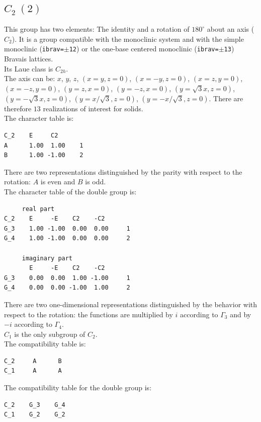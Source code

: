 \documentclass[12pt,a4paper]{article}
\begin{document}
\subsection{\color{web-blue}$C_2\ (2)$}
This group has two elements: The identity and a rotation of $180^\circ$ 
about an axis ($C_2$).
It is a group compatible with the monoclinic system and with the
simple monoclinic (\texttt{ibrav=$\pm$12}) or the one-base centered monoclinic 
(\texttt{ibrav=$\pm$13}) Bravais lattices. \\
Its Laue class is $C_{2h}$. \\
The axis can be:  
$x$, $y$, $z$, $(x=y, z=0)$, $(x=-y, z=0)$, $(x=z, y=0)$, $(x=-z, y=0)$,
$(y=z, x=0)$, $(y=-z, x=0)$, $(y=\sqrt{3}x, z=0)$, $(y=-\sqrt{3}x, z=0)$, 
$(y=x/\sqrt{3}, z=0)$, $(y=-x/\sqrt{3}, z=0)$. 
There are therefore $13$ realizations of interest for solids. \\
The character table is:
\begin{verbatim}
C_2    E     C2
A      1.00  1.00    1
B      1.00 -1.00    2
\end{verbatim}
There are two representations distinguished by the parity
with respect to the rotation: $A$ is even and $B$ is odd.\\
The character table of the double group is:
\begin{verbatim}
     real part
C_2    E     -E    C2    -C2
G_3    1.00 -1.00  0.00  0.00     1
G_4    1.00 -1.00  0.00  0.00     2

     imaginary part
       E     -E    C2    -C2
G_3    0.00  0.00  1.00 -1.00     1
G_4    0.00  0.00 -1.00  1.00     2
\end{verbatim}
There are two one-dimensional representations distinguished by the 
behavior with respect to the rotation: the functions
are multiplied by $i$ according to $\Gamma_3$ and by $-i$ according to 
$\Gamma_4$.\\
$C_1$ is the only subgroup of $C_2$. \\
The compatibility table is:
\begin{verbatim}
C_2     A      B  
C_1     A      A
\end{verbatim}
The compatibility table for the double group is:
\begin{verbatim}
C_2    G_3    G_4 
C_1    G_2    G_2
\end{verbatim}
\end{document}
